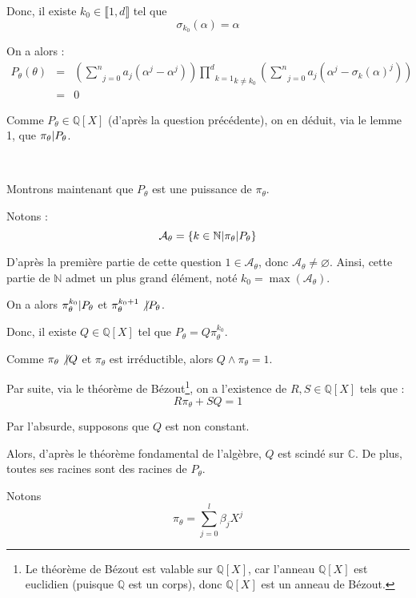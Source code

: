 Donc, il existe $k_0 \in \llbracket 1, d \rrbracket$ tel que
\[ \sigma_{k_0} (\alpha) = \alpha \]


On a alors :
\begin{eqnarray*}
  P_{\theta} (\theta) & = & \left( \underset{j = 0}{\overset{n}{\sum}} a_j
  (\alpha^j - \alpha^j) \right) \underset{k \neq k_0}{\underset{k =
  1}{\overset{d}{\prod}}} \left( \underset{j = 0}{\overset{n}{\sum}} a_j
  (\alpha^j - \sigma_k (\alpha)^j) \right)\\
  & = & 0
\end{eqnarray*}


Comme $P_{\theta} \in \mathbb{Q} [X]$ (d'apr{\`e}s la question
pr{\'e}c{\'e}dente), on en d{\'e}duit, via le lemme 1, que $\pi_{\theta} |
P_{\theta} $.

\

Montrons maintenant que $P_{\theta}$ est une puissance de $\pi_{\theta}$.

Notons :
\[ \mathcal{A}_{\theta} = \{ k \in \mathbb{N} |  \pi_{\theta} |
   P_{\theta}  \} \]


D'apr{\`e}s la premi{\`e}re partie de cette question $1 \in
\mathcal{A}_{\theta}$, donc $\mathcal{A}_{\theta} \neq \varnothing$. Ainsi,
cette partie de $\mathbb{N}$ admet un plus grand {\'e}l{\'e}ment, not{\'e}
$k_0 = \max (\mathcal{A}_{\theta})$.

On a alors $\pi^{k_0}_{\theta} | P_{\theta} $ et $\pi^{k_0 +
1}_{\theta} \not{| } P_{\theta}$.

Donc, il existe $Q \in \mathbb{Q} [X]$ tel que $P_{\theta} = Q
\pi^{k_0}_{\theta}$.

Comme $\pi_{\theta} \not{| } Q$ et $\pi _{\theta}$ est
irr{\'e}ductible, alors $Q \wedge \pi_{\theta} = 1$.

Par suite, via le th{\'e}or{\`e}me de B{\'e}zout\footnote{Le th{\'e}or{\`e}me
de B{\'e}zout est valable sur $\mathbb{Q} [X]$, car l'anneau $\mathbb{Q} [X]$
est euclidien (puisque $\mathbb{Q}$ est un corps), donc $\mathbb{Q} [X]$ est
un anneau de B{\'e}zout.}, on a l'existence de $R, S \in \mathbb{Q} [X]$ tels
que :
\[ R \pi_{\theta} + S Q = 1 \]


Par l'absurde, supposons que $Q$ est non constant.

Alors, d'apr{\`e}s le th{\'e}or{\`e}me fondamental de l'alg{\`e}bre, $Q$ est
scind{\'e} sur $\mathbb{C}$. De plus, toutes ses racines sont des racines de
$P_{\theta}$.

Notons
\[ \pi_{\theta} = \underset{j = 0}{\overset{l}{\sum}} \beta_j X^j \]


